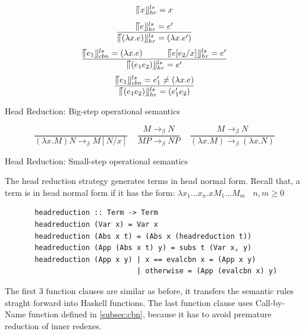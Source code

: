 \documentclass[a4paper,11pt,twoside]{report}
\begin{document}
\begin{equation*}
\llceil x \rrfloor ^{ls} _{hr} = x
\end{equation*}
\begin{equation*}
\frac{\llceil e \rrfloor ^{ls} _{hr} = e'}{\llceil (\lambda x.e) \rrfloor ^{ls} _{hr} = (\lambda x.e')}
\end{equation*}
\begin{equation*}
\frac{\llceil e_1 \rrfloor ^{ls} _{cbn} = (\lambda x.e)\ \ \ \ \ \ \ \ \ \llceil e[e_2/x] \rrfloor ^{ls} _{hr} = e'}{\llceil (e_1e_2) \rrfloor ^{ls} _{hr} = e'}
\end{equation*}
\begin{equation*}
\frac{\llceil e_1 \rrfloor ^{ls} _{cbn} = e'_1\neq (\lambda x.e)}{\llceil (e_1e_2) \rrfloor ^{ls} _{hr}  = (e'_1e_2)}
\end{equation*}
\begin{center}
Head Reduction: Big-step operational semantics
\end{center}


\begin{equation*}
\frac{}{(\lambda x.M)N \rightarrow _\beta M[N/x]}\ \ \ \ \  
\frac{M \rightarrow _\beta N}{MP \rightarrow _\beta NP}\ \ \ \ \ 
\frac{M \rightarrow _\beta N}{(\lambda x.M) \rightarrow _\beta (\lambda x.N)}
\end{equation*}
\begin{center}
Head Reduction: Small-step operational semantics
\end{center}

The head reduction strategy generates terms in head normal form. Recall that, a term is in head normal form if it has the form: $\lambda x_1\ldots x_n.xM_1\ldots M_m\ \ \ \ n,m\geqslant 0$

\begin{verbatim}
       headreduction :: Term -> Term
       headreduction (Var x) = Var x
       headreduction (Abs x t) = (Abs x (headreduction t))
       headreduction (App (Abs x t) y) = subs t (Var x, y)
       headreduction (App x y) | x == evalcbn x = (App x y)
                               | otherwise = (App (evalcbn x) y)  
\end{verbatim}

The first 3 function clauses are similar as before, it transfers the semantic rules straght forward into Haskell functions. The last function clause uses Call-by-Name function defined in \ref{subsec:cbn}, because it has to avoid premature reduction of inner redexes. 
\end{document}
